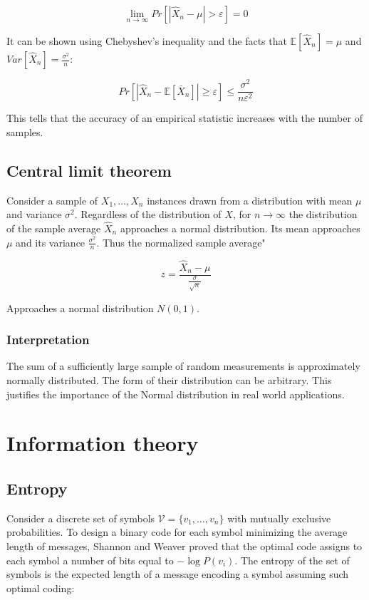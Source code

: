 	$$\lim\limits_{n\rightarrow\infty} Pr[|\hat{X}_n-\mu| >\varepsilon] = 0$$

	It can be shown using Chebyshev's inequality and the facts that $\mathbb{E}[\hat{X}_n] = \mu$ and $Var[\hat{X}_n] = \frac{\sigma^2}{n}$:

	$$Pr[|\hat{X}_n - \mathbb{E}[\bar{X}_n]| \ge\varepsilon] \le \frac{\sigma^2}{n\varepsilon^2}$$

	This tells that the accuracy of an empirical statistic increases with the number of samples.

	\subsection{Central limit theorem}
	Consider a sample of $X_1, \dots, X_n$ instances drawn from a distribution with mean $\mu$ and variance $\sigma^2$.
	Regardless of the distribution of $X$, for $n\rightarrow\infty$ the distribution of the sample average $\hat{X}_n$ approaches a normal distribution.
	Its mean approaches $\mu$ and its variance $\frac{\sigma^2}{n}$.
	Thus the normalized sample average"

	$$z = \frac{\hat{X}_n-\mu}{\frac{\sigma}{\sqrt{n}}}$$

	Approaches a normal distribution $N(0,1)$.

		\subsubsection{Interpretation}
		The sum of a sufficiently large sample of random measurements is approximately normally distributed.
		The form of their distribution can be arbitrary.
		This justifies the importance of the Normal distribution in real world applications.

\section{Information theory}

	\subsection{Entropy}
	Consider a discrete set of symbols $\mathcal{V} = \{v_1, \dots, v_n\}$ with mutually exclusive probabilities.
	To design a binary code for each symbol minimizing the average length of messages, Shannon and Weaver proved that the optimal code assigns to each symbol a number of bits equal to $-\log P(v_i)$.
	The entropy of the set of symbols is the expected length of a message encoding a symbol assuming such optimal coding:

